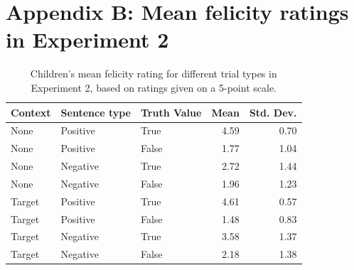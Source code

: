 \documentclass[man, noapacite]{apa2}
\begin{document}
\newpage

\section{Appendix B: Mean felicity ratings in Experiment 2}\label{appendix:exp2}

\begin{table}[h!]
\caption{\label{tab:m3} Children's mean felicity rating for different trial types in Experiment 2, based on ratings given on a 5-point scale.}
\begin{center}
\small\addtolength{\tabcolsep}{-5pt}
\begin{tabular}{lllrr}
 \hline
 Context & Sentence type & Truth Value & Mean & Std. Dev. \\
 \hline
 None & Positive & True & 4.59 & 0.70\\
 None & Positive & False & 1.77 & 1.04\\
 None & Negative & True & 2.72 & 1.44 \\
 None & Negative & False & 1.96 &1.23 \\
 Target & Positive & True & 4.61 & 0.57\\
 Target & Positive & False & 1.48 & 0.83 \\
 Target & Negative & True & 3.58 & 1.37 \\
 Target & Negative & False & 2.18 & 1.38\\
  \hline
\end{tabular}
\end{center}
\end{table}
\end{document}
